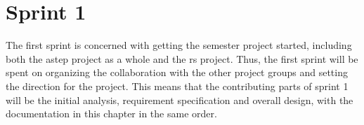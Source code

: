 \chapter{Sprint 1}
The first sprint is concerned with getting the semester project started, including both the \gls{astep} project as a whole and the \gls{rs} project.
Thus, the first sprint will be spent on organizing the collaboration with the other project groups and setting the direction for the project.
This means that the contributing parts of sprint 1 will be the initial analysis, requirement specification and overall design, with the documentation in this chapter in the same order.




%
%